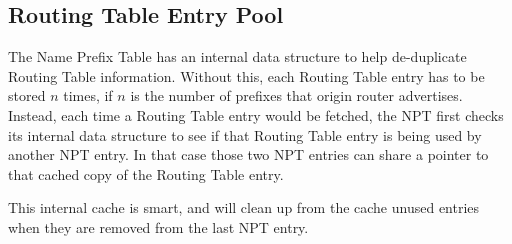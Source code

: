 \subsection{Routing Table Entry Pool}
The Name Prefix Table has an internal data structure to help
de-duplicate Routing Table information. Without this, each Routing
Table entry has to be stored $n$ times, if $n$ is the number of
prefixes that origin router advertises. Instead, each time a Routing
Table entry would be fetched, the NPT first checks its internal data
structure to see if that Routing Table entry is being used by another
NPT entry. In that case those two NPT entries can share a pointer to
that cached copy of the Routing Table entry.

This internal cache is smart, and will clean up from the cache unused
entries when they are removed from the last NPT entry.
